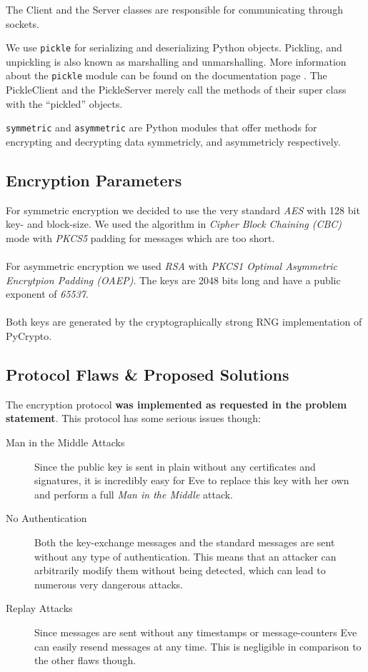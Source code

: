 \documentclass[11pt, a4paper]{article}
\begin{document}
The Client and the Server classes are responsible for communicating
through sockets. 

We use \lstinline|pickle| for serializing and deserializing Python
objects. Pickling, and unpickling is also known as marshalling and
unmarshalling. More information about the \lstinline|pickle| module
can be found on the documentation page \cite{pickle}. The PickleClient
and the PickleServer merely call the methods of their super class with
the ``pickled'' objects.

\lstinline|symmetric| and \lstinline|asymmetric| are Python modules
that offer methods for encrypting and decrypting data symmetricly, and
asymmetricly respectively.

\subsection{Encryption Parameters}

For symmetric encryption we decided to use the very standard \textit{AES} with
128 bit key- and block-size. We used the algorithm in \textit{Cipher Block
	Chaining (CBC)} mode with \textit{PKCS5} padding for messages which are too
short.
\\\\
For asymmetric encryption we used \textit{RSA} with \textit{PKCS1 Optimal
	Asymmetric Encrytpion Padding (OAEP)}. The keys are 2048 bits long and have a
public exponent of \textit{65537}.
\\\\
Both keys are generated by the cryptographically strong RNG implementation of
PyCrypto.

\subsection{Protocol Flaws \& Proposed Solutions}

The encryption protocol \textbf{was implemented as requested in the problem
	statement}. This protocol has some serious issues though:

\begin{description}
	
	\item[Man in the Middle Attacks] Since the public key is sent in plain
	without any certificates and signatures, it is incredibly easy for Eve to
	replace this key with her own and perform a full \textit{Man in the Middle}
	attack.
	
	\item[No Authentication] Both the key-exchange messages and the standard
	messages are sent without any type of authentication. This means that an
	attacker can arbitrarily modify them without being detected, which can
	lead to numerous very dangerous attacks.
	
	\item[Replay Attacks] Since messages are sent without any timestamps or
	message-counters Eve can easily resend messages at any time. This is
	negligible in comparison to the other flaws though.
	
\end{description}
\end{document}

